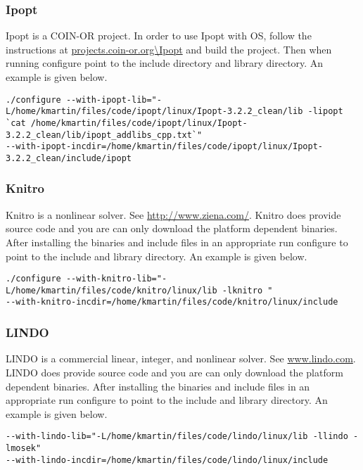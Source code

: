 \documentclass[11pt]{article}
\renewcommand{\_}{{\char"5F}}
\renewcommand{\{}{{\char"7B}}
\renewcommand{\}}{{\char"7D}}
\renewcommand{\^}{{\char"0D}}
\renewcommand{\'}{{\char"0D}}
\begin{document}
\subsubsection{Ipopt}

Ipopt is a COIN-OR project.  In order to use Ipopt with OS, follow the instructions at  \url{projects.coin-or.org\Ipopt} and build the project. Then when running configure point to the include directory and library directory.  An example is given below.

{\small
\begin{verbatim}
./configure --with-ipopt-lib="-L/home/kmartin/files/code/ipopt/linux/Ipopt-3.2.2_clean/lib -lipopt  
`cat /home/kmartin/files/code/ipopt/linux/Ipopt-3.2.2_clean/lib/ipopt_addlibs_cpp.txt`" 
--with-ipopt-incdir=/home/kmartin/files/code/ipopt/linux/Ipopt-3.2.2_clean/include/ipopt 
\end{verbatim}
}

\subsubsection{Knitro}


Knitro is a nonlinear solver. See \url{http://www.ziena.com/}.  Knitro does provide source code and you are can only download the platform dependent binaries. After installing the binaries and include files in an appropriate run configure to point to the include and library directory. An example is given below.

\begin{verbatim}
./configure --with-knitro-lib="-L/home/kmartin/files/code/knitro/linux/lib -lknitro " 
--with-knitro-incdir=/home/kmartin/files/code/knitro/linux/include
\end{verbatim}


\subsubsection{LINDO}

LINDO is a commercial linear, integer, and nonlinear solver. See \url{www.lindo.com}.  LINDO does provide source code and you are can only download the platform dependent binaries. After installing the binaries and include files in an appropriate run configure to point to the include and library directory. An example is given below.

\begin{verbatim}
--with-lindo-lib="-L/home/kmartin/files/code/lindo/linux/lib -llindo -lmosek" 
--with-lindo-incdir=/home/kmartin/files/code/lindo/linux/include
\end{verbatim}
\end{document}
